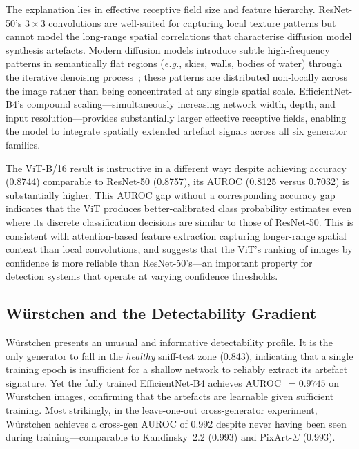 \documentclass[journal]{IEEEtran}
\newcommand{\eg}{\textit{e.g.}}
\begin{document}
The explanation lies in effective receptive field size and
feature hierarchy.
ResNet-50's $3 \times 3$ convolutions are well-suited for capturing
local texture patterns but cannot model the long-range spatial
correlations that characterise diffusion model synthesis artefacts.
Modern diffusion models introduce subtle high-frequency patterns
in semantically flat regions (\eg, skies, walls, bodies of water)
through the iterative denoising process~\cite{corvi2023detection};
these patterns are distributed non-locally across the image rather
than being concentrated at any single spatial scale.
EfficientNet-B4's compound scaling---simultaneously increasing
network width, depth, and input resolution---provides substantially
larger effective receptive fields, enabling the model to integrate
spatially extended artefact signals across all six generator families.

The ViT-B/16 result is instructive in a different way: despite
achieving accuracy (0.8744) comparable to ResNet-50 (0.8757), its
AUROC (0.8125 versus 0.7032) is substantially higher.
This AUROC gap without a corresponding accuracy gap indicates that
the ViT produces better-calibrated class probability estimates even
where its discrete classification decisions are similar to those of
ResNet-50.
This is consistent with attention-based feature extraction capturing
longer-range spatial context than local convolutions, and suggests
that the ViT's ranking of images by confidence is more reliable than
ResNet-50's---an important property for detection systems that
operate at varying confidence thresholds.

\subsection{W\"{u}rstchen and the Detectability Gradient}
\label{ssec:disc_wuerstchen}

W\"{u}rstchen presents an unusual and informative detectability
profile.
It is the only generator to fall in the \emph{healthy} sniff-test
zone (0.843), indicating that a single training epoch is insufficient
for a shallow network to reliably extract its artefact signature.
Yet the fully trained EfficientNet-B4 achieves AUROC~$= 0.9745$
on W\"{u}rstchen images, confirming that the artefacts are
learnable given sufficient training.
Most strikingly, in the leave-one-out cross-generator experiment,
W\"{u}rstchen achieves a cross-gen AUROC of 0.992 despite never
having been seen during training---comparable to
Kandinsky~2.2 (0.993) and PixArt-$\Sigma$ (0.993).
\end{document}
